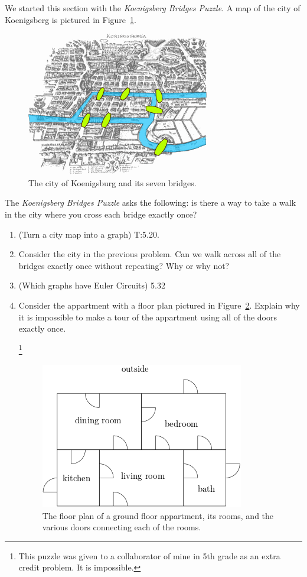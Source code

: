 \documentclass[11pt, letterpaper]{article}
\begin{document}
We started this section with the \emph{Koenigsberg Bridges Puzzle}. 
A map of the city of Koenigsberg is pictured in Figure~\ref{F:seven-bridges}.
\begin{figure}[h]
	\begin{center}
		\includegraphics[scale=0.5]{konigsberg_bridges.png}
	\end{center}
	\caption{The city of Koenigsburg and its seven bridges.}\label{F:seven-bridges}
\end{figure}
The \emph{Koenigsberg Bridges Puzzle} asks the following: is there a way to take a walk in the city where you cross each bridge exactly once?

\begin{enumerate}
	\item (Turn a city map into a graph) T:5.20.
	\item Consider the city in the previous problem. Can we walk across all of the bridges exactly once without repeating? Why or why not?
	\item (Which graphs have Euler Circuits) 5.32
	\item Consider the appartment with a floor plan pictured in Figure~\ref{F:floor-plan}.
	Explain why it is impossible to make a tour of the appartment using all of the doors exactly once. 
	
	\footnote{This puzzle was given to a collaborator of mine in 5th grade as an extra credit problem. 
	It is impossible. 
	}
	
	\begin{figure}[h]
		\begin{center}
			\includegraphics[scale=0.5]{floor-plan}
		\end{center}
		\caption{The floor plan of a ground floor appartment, its rooms, and the various doors connecting each of the rooms.  }\label{F:floor-plan}
	\end{figure}
	
	
	
	
\end{enumerate}
\end{document}
